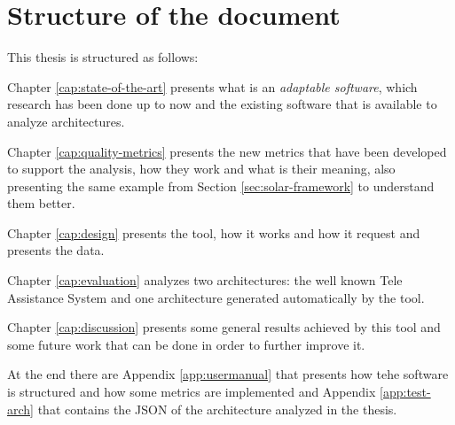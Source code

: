 \section{Structure of the document}
This thesis is structured as follows:

Chapter \ref{cap:state-of-the-art} presents what is an \emph{adaptable software}, which research has been done up to now and the existing software that is available to analyze architectures.

Chapter \ref{cap:quality-metrics} presents the new metrics that have been developed to support the analysis, how they work and what is their meaning, also presenting the same example from Section \ref{sec:solar-framework} to understand them better.

Chapter \ref{cap:design} presents the tool, how it works and how it request and presents the data.

Chapter \ref{cap:evaluation} analyzes two architectures: the well known Tele Assistance System \cite{teleassist} and one architecture generated automatically by the tool.

Chapter \ref{cap:discussion} presents some general results achieved by this tool and some future work that can be done in order to further improve it.

At the end there are Appendix \ref{app:usermanual} that presents how tehe software is structured and how some metrics are implemented and Appendix \ref{app:test-arch} that contains the JSON of the architecture analyzed in the thesis.